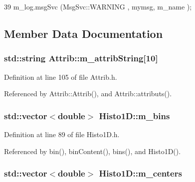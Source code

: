 \begin{DoxyCode}
39 { m_log.msgSvc (MsgSvc::WARNING , mymsg, m_name ); }
\end{DoxyCode}


\subsection{Member Data Documentation}
\hypertarget{classAttrib_a3414521d7a82476e874b25a5407b5e63}{
\subsubsection[{m\_\-attribString}]{\setlength{\rightskip}{0pt plus 5cm}std::string {\bf Attrib::m\_\-attribString}\mbox{[}10\mbox{]}}}
\label{classAttrib_a3414521d7a82476e874b25a5407b5e63}


Definition at line 105 of file Attrib.h.

Referenced by Attrib::Attrib(), and Attrib::attributs().\hypertarget{classHisto1D_a7a82923d3938739904469f5aa0a517ca}{
\subsubsection[{m\_\-bins}]{\setlength{\rightskip}{0pt plus 5cm}std::vector$<$double$>$ {\bf Histo1D::m\_\-bins}}}
\label{classHisto1D_a7a82923d3938739904469f5aa0a517ca}


Definition at line 89 of file Histo1D.h.

Referenced by bin(), binContent(), bins(), and Histo1D().\hypertarget{classHisto1D_a0e03676ed176aaad2f615fa84b8ffcd3}{
\subsubsection[{m\_\-centers}]{\setlength{\rightskip}{0pt plus 5cm}std::vector$<$double$>$ {\bf Histo1D::m\_\-centers}}}
\label{classHisto1D_a0e03676ed176aaad2f615fa84b8ffcd3}


